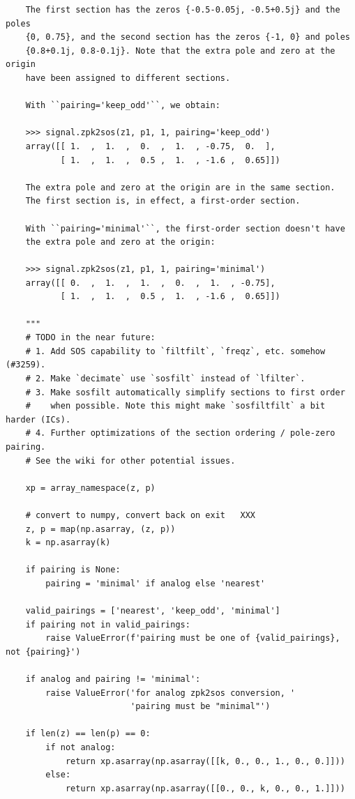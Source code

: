 \documentclass[12pt,a4paper]{article}
\begin{document}
\begin{itemize}
\begin{verbatim}
    The first section has the zeros {-0.5-0.05j, -0.5+0.5j} and the poles
    {0, 0.75}, and the second section has the zeros {-1, 0} and poles
    {0.8+0.1j, 0.8-0.1j}. Note that the extra pole and zero at the origin
    have been assigned to different sections.

    With ``pairing='keep_odd'``, we obtain:

    >>> signal.zpk2sos(z1, p1, 1, pairing='keep_odd')
    array([[ 1.  ,  1.  ,  0.  ,  1.  , -0.75,  0.  ],
           [ 1.  ,  1.  ,  0.5 ,  1.  , -1.6 ,  0.65]])

    The extra pole and zero at the origin are in the same section.
    The first section is, in effect, a first-order section.

    With ``pairing='minimal'``, the first-order section doesn't have
    the extra pole and zero at the origin:

    >>> signal.zpk2sos(z1, p1, 1, pairing='minimal')
    array([[ 0.  ,  1.  ,  1.  ,  0.  ,  1.  , -0.75],
           [ 1.  ,  1.  ,  0.5 ,  1.  , -1.6 ,  0.65]])

    """
    # TODO in the near future:
    # 1. Add SOS capability to `filtfilt`, `freqz`, etc. somehow (#3259).
    # 2. Make `decimate` use `sosfilt` instead of `lfilter`.
    # 3. Make sosfilt automatically simplify sections to first order
    #    when possible. Note this might make `sosfiltfilt` a bit harder (ICs).
    # 4. Further optimizations of the section ordering / pole-zero pairing.
    # See the wiki for other potential issues.

    xp = array_namespace(z, p)

    # convert to numpy, convert back on exit   XXX
    z, p = map(np.asarray, (z, p))
    k = np.asarray(k)

    if pairing is None:
        pairing = 'minimal' if analog else 'nearest'

    valid_pairings = ['nearest', 'keep_odd', 'minimal']
    if pairing not in valid_pairings:
        raise ValueError(f'pairing must be one of {valid_pairings}, not {pairing}')

    if analog and pairing != 'minimal':
        raise ValueError('for analog zpk2sos conversion, '
                         'pairing must be "minimal"')

    if len(z) == len(p) == 0:
        if not analog:
            return xp.asarray(np.asarray([[k, 0., 0., 1., 0., 0.]]))
        else:
            return xp.asarray(np.asarray([[0., 0., k, 0., 0., 1.]]))


\end{verbatim}
\end{itemize}
\end{document}
